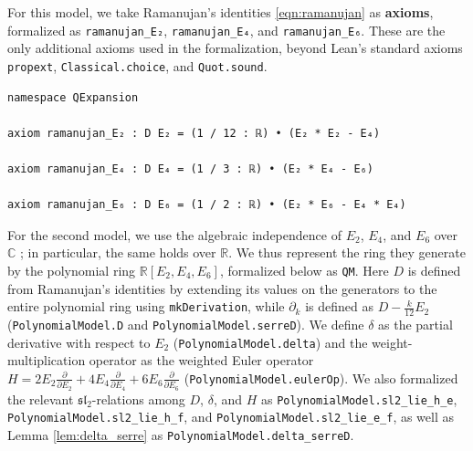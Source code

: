 \documentclass[10pt,reqno]{amsproc}
\newcommand{\1}{\mathds{1}}	%
\theoremstyle{definition}
\theoremstyle{remark}
\begin{document}
For this model, we take Ramanujan's identities \eqref{eqn:ramanujan} as \textbf{axioms}, formalized as \lstinline|ramanujan_E₂|, \lstinline|ramanujan_E₄|, and \lstinline|ramanujan_E₆|.
These are the only additional axioms used in the formalization, beyond Lean's standard axioms \lstinline|propext|, \lstinline|Classical.choice|, and \lstinline|Quot.sound|.

\begin{lstlisting}[language=lean]
namespace QExpansion

axiom ramanujan_E₂ : D E₂ = (1 / 12 : ℝ) • (E₂ * E₂ - E₄)

axiom ramanujan_E₄ : D E₄ = (1 / 3 : ℝ) • (E₂ * E₄ - E₆)

axiom ramanujan_E₆ : D E₆ = (1 / 2 : ℝ) • (E₂ * E₆ - E₄ * E₄)
\end{lstlisting}

For the second model, we use the algebraic independence of $E_2$, $E_4$, and $E_6$ over $\mathbb{C}$ \cite[Lemma~117, p.~70]{martin2005formes}; in particular, the same holds over $\mathbb{R}$. We thus represent the ring they generate by the polynomial ring $\mathbb{R}[E_2,E_4,E_6]$, formalized below as \lstinline|QM|.
Here $D$ is defined from Ramanujan's identities by extending its values on the generators to the entire polynomial ring using \lstinline|mkDerivation|, while $\partial_k$ is defined as $D - \frac{k}{12} E_2$ (\lstinline|PolynomialModel.D| and \lstinline|PolynomialModel.serreD|).
We define $\delta$ as the partial derivative with respect to $E_2$ (\lstinline|PolynomialModel.delta|) and the weight-multiplication operator as the weighted Euler operator $H = 2E_2 \frac{\partial}{\partial E_2} + 4E_4 \frac{\partial}{\partial E_4} + 6E_6 \frac{\partial}{\partial E_6}$ (\lstinline|PolynomialModel.eulerOp|).
We also formalized the relevant $\mathfrak{sl}_2$-relations among $D$, $\delta$, and $H$ as \lstinline|PolynomialModel.sl2_lie_h_e|, \lstinline|PolynomialModel.sl2_lie_h_f|, and \lstinline|PolynomialModel.sl2_lie_e_f|, as well as Lemma \ref{lem:delta_serre} as \lstinline|PolynomialModel.delta_serreD|.
\end{document}
